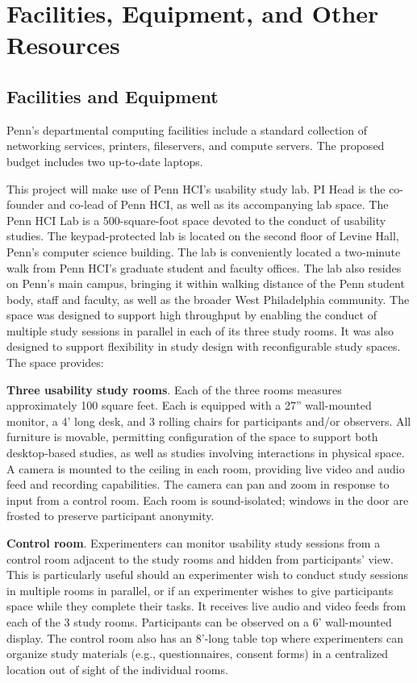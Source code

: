 \section*{Facilities, Equipment, and Other Resources}

\subsection*{Facilities and Equipment}

Penn's departmental computing facilities include a standard collection of
networking services, printers, fileservers, and compute servers. The proposed budget
includes two up-to-date laptops.


\smallskip

This project will make use of Penn HCI's usability study lab. PI Head is the co-founder and co-lead of Penn HCI, as well as its accompanying lab space. The Penn HCI Lab is a 500-square-foot space devoted to the conduct of usability studies. The keypad-protected lab is located on the second floor of Levine Hall, Penn's computer science building. The lab is conveniently located a two-minute walk from Penn HCI's graduate student and faculty offices. The lab also resides on Penn's main campus, bringing it within walking distance of the Penn student body, staff and faculty, as well as the broader West Philadelphia community. The space was designed to support high throughput by enabling the conduct of multiple study sessions in parallel in each of its three study rooms. It was also designed to support flexibility in study design with reconfigurable study spaces. The space provides:

\textbf{Three usability study rooms}. Each of the three rooms measures approximately 100 square feet. Each is equipped with a 27'' wall-mounted monitor, a 4' long desk, and 3 rolling chairs for participants and/or observers. All furniture is movable, permitting configuration of the space to support both desktop-based studies, as well as studies involving interactions in physical space. A camera is mounted to the ceiling in each room, providing live video and audio feed and recording capabilities. The camera can pan and zoom in response to input from a control room. Each room is sound-isolated; windows in the door are frosted to preserve participant anonymity. 

\textbf{Control room}. Experimenters can monitor usability study sessions from a control room adjacent to the study rooms and hidden from participants' view. This is particularly useful should an experimenter wish to conduct study sessions in multiple rooms in parallel, or if an experimenter wishes to give participants space while they complete their tasks. It receives live audio and video feeds from each of the 3 study rooms. Participants can be observed on a 6' wall-mounted display. The control room also has an 8'-long table top where experimenters can organize study materials (e.g., questionnaires, consent forms) in a centralized location out of sight of the individual rooms.

